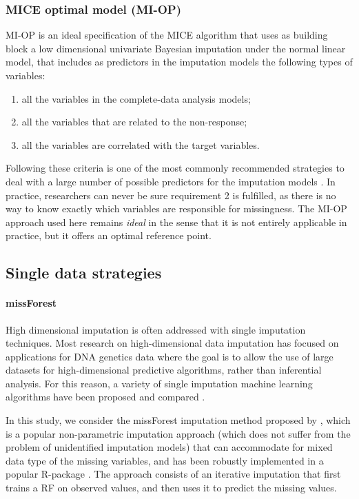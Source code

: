 \subsubsection{MICE optimal model (MI-OP)}
	MI-OP is an ideal specification of the MICE algorithm that uses as building block a low dimensional univariate 
	Bayesian imputation under the normal linear model, that includes as predictors in the imputation models
	the following types of variables:

	\begin{enumerate}

	\item all the variables in the complete-data analysis models;
	\item all the variables that are related to the non-response;
	\item all the variables are correlated with the target variables.

	\end{enumerate}

	Following these criteria is one of the most commonly recommended strategies to deal with a large 
	number of possible predictors for the imputation models \citep[p. 168]{vanBuuren:2012}.
	In practice, researchers can never be sure requirement 2 is fulfilled, as there is no way to know exactly 
	which variables are responsible for missingness.
	The MI-OP approach used here remains \emph{ideal} in the sense that it is not entirely applicable in practice, 
	but it offers an optimal reference point.
	
\subsection{Single data strategies}

\paragraph{missForest}
	High dimensional imputation is often addressed with single imputation techniques.
	Most research on high-dimensional data imputation has focused on applications for DNA 
	genetics data where the goal is to allow the use of large datasets for high-dimensional
	predictive algorithms, rather than inferential analysis.
	For this reason, a variety of single imputation machine learning algorithms have been proposed
	and compared \citep{deAndradeSilvaHruschka:2009, stekhovenBuhlmann:2011}.

	In this study, we consider the missForest imputation method proposed by \cite{stekhovenBuhlmann:2011},
	which is a popular non-parametric imputation approach (which does not suffer from the problem of unidentified 
	imputation models) that can accommodate for mixed data type of the missing variables, and has been robustly
	implemented in a popular R-package \citep{missForest}.
	The approach consists of an iterative imputation that first trains a RF on observed values, and then uses it 
	to predict the missing values.
	
